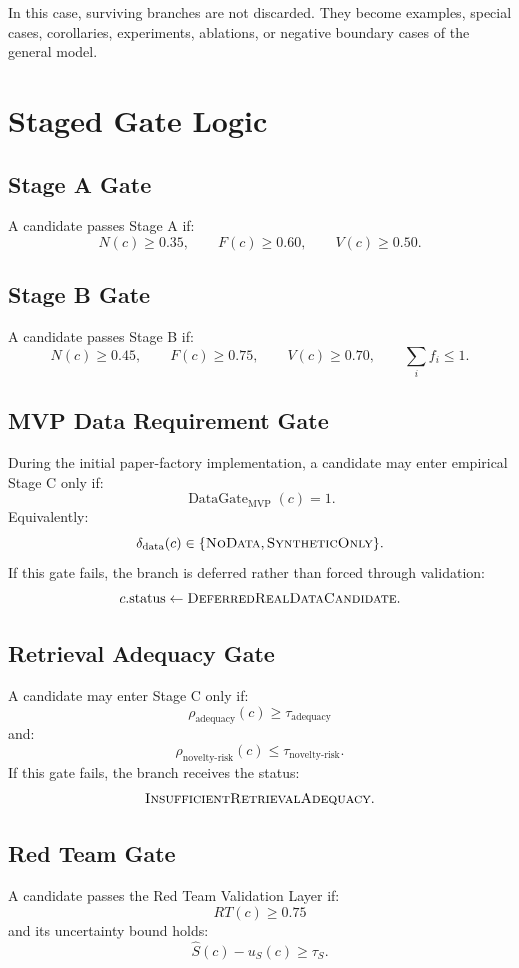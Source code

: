 \documentclass[11pt]{article}
\begin{document}
In this case, surviving branches are not discarded. They become examples, special cases, corollaries, experiments, ablations, or negative boundary cases of the general model.

\section{Staged Gate Logic}

\subsection{Stage A Gate}
A candidate passes Stage A if:
$$
N(c)\geq0.35, \qquad F(c)\geq0.60, \qquad V(c)\geq0.50.
$$

\subsection{Stage B Gate}
A candidate passes Stage B if:
$$
N(c)\geq0.45, \qquad F(c)\geq0.75, \qquad V(c)\geq0.70, \qquad \sum_i f_i\leq1.
$$

\subsection{MVP Data Requirement Gate}
During the initial paper-factory implementation, a candidate may enter empirical Stage C only if:
$$
\operatorname{DataGate}_{\text{MVP}}(c)=1.
$$
Equivalently:
$$
\delta_{\text{data}}(c)\in\{\textsc{NoData},\textsc{SyntheticOnly}\}.
$$
If this gate fails, the branch is deferred rather than forced through validation:
$$
c.\text{status}\leftarrow\textsc{DeferredRealDataCandidate}.
$$

\subsection{Retrieval Adequacy Gate}
A candidate may enter Stage C only if:
$$
\rho_{\text{adequacy}}(c)\geq\tau_{\text{adequacy}}
$$
and:
$$
\rho_{\text{novelty-risk}}(c)\leq\tau_{\text{novelty-risk}}.
$$
If this gate fails, the branch receives the status:
$$
\textsc{InsufficientRetrievalAdequacy}.
$$

\subsection{Red Team Gate}
A candidate passes the Red Team Validation Layer if:
$$
RT(c)\geq0.75
$$
and its uncertainty bound holds:
$$
\hat{S}(c)-u_S(c)\geq\tau_S.
$$
\end{document}
